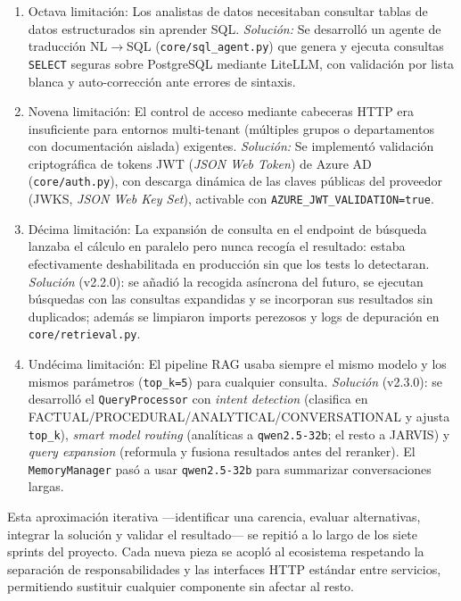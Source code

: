\begin{enumerate}
    \item Octava limitación: Los analistas de datos necesitaban consultar tablas de datos estructurados sin aprender SQL. \textit{Solución:} Se desarrolló un agente de traducción NL$\rightarrow$SQL (\texttt{core/sql\_agent.py}) que genera y ejecuta consultas \texttt{SELECT} seguras sobre PostgreSQL mediante LiteLLM, con validación por lista blanca y auto-corrección ante errores de sintaxis.

    \item Novena limitación: El control de acceso mediante cabeceras HTTP era insuficiente para entornos multi-tenant (múltiples grupos o departamentos con documentación aislada) exigentes. \textit{Solución:} Se implementó validación criptográfica de tokens JWT (\textit{JSON Web Token}) de Azure AD (\texttt{core/auth.py}), con descarga dinámica de las claves públicas del proveedor (JWKS, \textit{JSON Web Key Set}), activable con \texttt{AZURE\_JWT\_VALIDATION=true}.

    \item Décima limitación: La expansión de consulta en el endpoint de búsqueda lanzaba el cálculo en paralelo pero nunca recogía el resultado: estaba efectivamente deshabilitada en producción sin que los tests lo detectaran. \textit{Solución} (v2.2.0): se añadió la recogida asíncrona del futuro, se ejecutan búsquedas con las consultas expandidas y se incorporan sus resultados sin duplicados; además se limpiaron imports perezosos y logs de depuración en \texttt{core/retrieval.py}.

    \item Undécima limitación: El pipeline RAG usaba siempre el mismo modelo y los mismos parámetros (\texttt{top\_k=5}) para cualquier consulta. \textit{Solución} (v2.3.0): se desarrolló el \texttt{QueryProcessor} con \textit{intent detection} (clasifica en FACTUAL/PROCEDURAL/ANALYTICAL/CONVERSATIONAL y ajusta \texttt{top\_k}), \textit{smart model routing} (analíticas a \texttt{qwen2.5-32b}; el resto a JARVIS) y \textit{query expansion} (reformula y fusiona resultados antes del reranker). El \texttt{MemoryManager} pasó a usar \texttt{qwen2.5-32b} para summarizar conversaciones largas.
\end{enumerate}

Esta aproximación iterativa ---identificar una carencia, evaluar alternativas, integrar la solución y validar el resultado--- se repitió a lo largo de los siete sprints del proyecto. Cada nueva pieza se acopló al ecosistema respetando la separación de responsabilidades y las interfaces HTTP estándar entre servicios, permitiendo sustituir cualquier componente sin afectar al resto.

